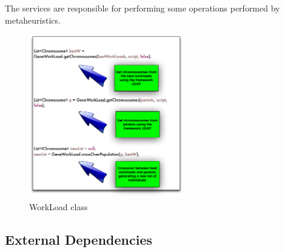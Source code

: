 \documentclass[espaco=umemeio,chapter=TITLE,twoside,openright]{abnt}
\begin{document}
The services are responsible for performing some operations performed by metaheuristics.

\begin{figure}[!h]
\centering
\includegraphics[width=0.6\textwidth]{./images/operationservice.png}
\caption{WorkLoad class}
\label{fig:emulator}
\end{figure}

\subsection{External Dependencies}



%

%
\end{document}
